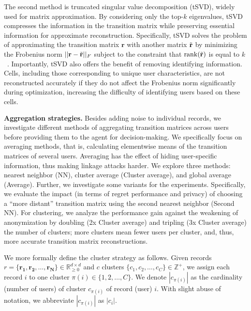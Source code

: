\documentclass{article}
\begin{document}
The second method is truncated singular value decomposition (tSVD), widely used for matrix approximation. By considering only the top-$k$ eigenvalues, tSVD compresses the information in the transition matrix while preserving essential information for approximate reconstruction. Specifically, tSVD solves the problem of approximating the transition matrix $\mathbf{r}$ with another matrix $\Tilde{\mathbf{r}}$ by minimizing the Frobenius norm $||\mathbf{r}-\Tilde{\mathbf{r}}||_F$ subject to the constraint that $\operatorname{rank}(\Tilde{\mathbf{r}})$ is equal to $k$~\cite{svd}. Importantly, tSVD also offers the benefit of removing identifying information. Cells, including those corresponding to unique user characteristics, are not reconstructed accurately if they do not affect the Frobenius norm significantly during optimization, increasing the difficulty of identifying users based on these cells.

\textbf{Aggregation strategies.} Besides adding noise to individual records, we investigate different methods of aggregating transition matrices across users before providing them to the agent for decision-making. We specifically focus on averaging methods, that is, calculating elementwise means of the transition matrices of several users. Averaging has the effect of hiding user-specific information, thus making linkage attacks harder. We explore three methods: nearest neighbor (NN), cluster average (Cluster average), and global average (Average). Further, we investigate some variants for the experiments. Specifically, we evaluate the impact (in terms of regret performance and privacy) of choosing a ``more distant'' transition matrix using the second nearest neighbor (Second NN). For clustering, we analyze the performance gain against the weakening of anonymization by doubling (2x Cluster average) and tripling (3x Cluster average) the number of clusters; more clusters mean fewer users per cluster, and, thus, more accurate transition matrix reconstructions. 

We more formally define the cluster strategy as follows. Given records $r = \{\mathbf{r_1}, \mathbf{r_2}, \dots, \mathbf{r_N}\} \in \mathbb{R}_{\geq 0}^{d \times d}$ and $c$ clusters $\{c_1, c_2, \dots, c_C\} \in \mathbb{Z}^+$, we assign each record $i$ to one cluster $\pi(i) \in \{1, 2, \dots, C\}$. We denote $|c_{\pi(i)}|$ as the cardinality (number of users) of cluster $c_{\pi(i)}$ of record (user) $i$. With slight abuse of notation, we abbreviate $|c_{\pi(i)}|$ as $|c_{i}|$.
\end{document}
